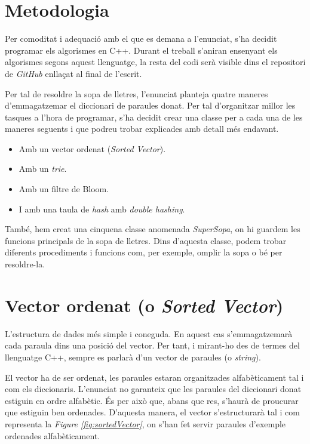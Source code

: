 \documentclass[titlepage]{article}
\begin{document}
\section{Metodologia}
Per comoditat i adequació amb el  que es demana a l'enunciat, s'ha decidit programar els algorismes en C++. Durant el treball s'aniran ensenyant els algorismes segons aquest llenguatge, la resta del codi serà visible dins el repositori de \textit{GitHub} enllaçat al final de l'escrit.\newline\par
Per tal de resoldre la sopa de lletres, l'enunciat planteja quatre maneres d'emmagatzemar el diccionari de paraules donat. Per tal d'organitzar millor les tasques a l'hora de programar, s'ha decidit crear una classe per a cada una de les maneres seguents i que podreu trobar explicades amb detall més endavant.
\begin{itemize}
  \item Amb un vector ordenat (\textit{Sorted Vector}).
  \item Amb un \textit{trie}.
  \item Amb un filtre de Bloom.
  \item I amb una taula de \textit{hash} amb \textit{double hashing}.
\end{itemize}

També, hem creat una cinquena classe anomenada \textit{SuperSopa}, on hi guardem les funcions principals de la sopa de lletres. Dins d'aquesta classe, podem trobar diferents procediments i funcions com, per exemple, omplir la sopa o bé per resoldre-la.\par

\clearpage
\section{Vector ordenat (o \textit{Sorted Vector})}
L'estructura de dades més simple i coneguda. En aquest cas s'emmagatzemarà cada paraula dins una posició del vector. Per tant, i mirant-ho des de termes del llenguatge C++, sempre es parlarà d'un vector de paraules (o \textit{string}).\newline\par

El vector ha de ser ordenat, les paraules estaran organitzades alfabèticament tal i com els diccionaris. L'enunciat no garanteix que les paraules del diccionari donat estiguin en ordre alfabètic. És per això que, abans que res, s'haurà de proucurar que estiguin ben ordenades. D'aquesta manera, el vector s'estructurarà tal i com representa la \textit{Figure \ref{fig:sortedVector}}, on s'han fet servir paraules d'exemple ordenades alfabèticament.
\end{document}
